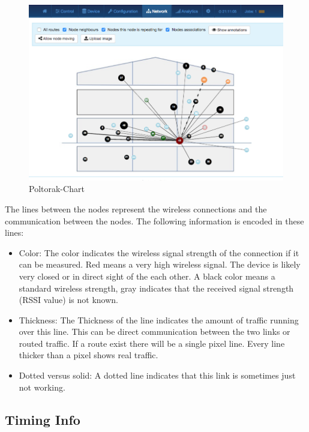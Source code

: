 \begin{figure}
\begin{center}
\includegraphics[width=1.0\textwidth]{pngs/cap7/eui24.png}
\caption {Poltorak-Chart}
\label{c5:poltos}
\end{center}
\end{figure}

The lines between the nodes represent the wireless connections and the communication between
the nodes. The following information is encoded in these lines:

\begin{itemize}
\item Color: The color indicates the wireless signal strength of the connection if it can be
measured. Red means a very high wireless signal.
The device is likely very closed or in direct sight of the each other. A black color means a
standard wireless strength, gray indicates that the received signal strength (RSSI value) 
is not known.

\item Thickness: The Thickness of the line indicates the amount of traffic running over
this line. This can be direct communication between the two links or routed traffic. If a 
route exist there will be a single pixel line. Every line thicker than a pixel shows real 
traffic.

\item Dotted versus solid: A dotted line indicates that this link is sometimes just not working.
\end{itemize}


\subsection{Timing Info}

